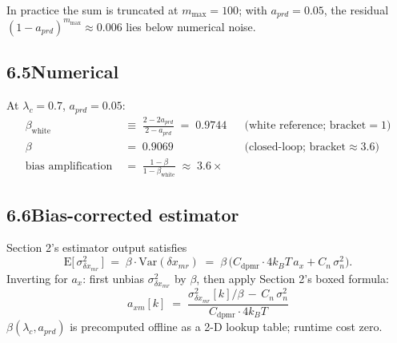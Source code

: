 \documentclass[11pt]{article}
\newcommand{\lc}{\lambda_c}
\newcommand{\kB}{k_B}
\begin{document}
In practice the sum is truncated at $m_{\max}\!=\!100$; with $a_{prd}\!=\!0.05$,
the residual $(1{-}a_{prd})^{m_{\max}}\!\approx\!0.006$ lies below numerical noise.

\subsection*{6.5\quad Numerical}

At $\lc = 0.7$, $a_{prd} = 0.05$:
\begin{align*}
\beta_{\mathrm{white}} &\;\equiv\; \frac{2 - 2 a_{prd}}{2 - a_{prd}} \;=\; 0.9744
  &&\text{(white reference; bracket}=1) \\[2pt]
\beta &\;=\; 0.9069
  &&\text{(closed-loop; bracket}\!\approx\!3.6) \\[2pt]
\text{bias amplification} &\;=\; \frac{1 - \beta}{1 - \beta_{\mathrm{white}}} \;\approx\; 3.6\times
\end{align*}

\subsection*{6.6\quad Bias-corrected estimator}

Section 2's estimator output satisfies
\[
\mathrm{E}\!\bigl[\,\sigma^{2}_{\delta x_{mr}}\,\bigr]
  \;=\; \beta\cdot\mathrm{Var}(\delta x_{mr})
  \;=\; \beta\,\bigl(C_{\mathrm{dpmr}}\cdot 4\kB T\,a_x + C_{n}\,\sigma^{2}_n\bigr).
\]
Inverting for $a_x$: first unbias $\sigma^{2}_{\delta x_{mr}}$ by $\beta$,
then apply Section 2's boxed formula:
\begin{equation}
\boxed{\;a_{xm}[k] \;=\; \frac{\sigma^{2}_{\delta x_{mr}}[k]/\beta \,-\, C_{n}\,\sigma^{2}_n}
                                   {C_{\mathrm{dpmr}}\cdot 4\kB T}\;}
\end{equation}
$\beta(\lc, a_{prd})$ is precomputed offline as a 2-D lookup table; runtime cost zero.
\end{document}
